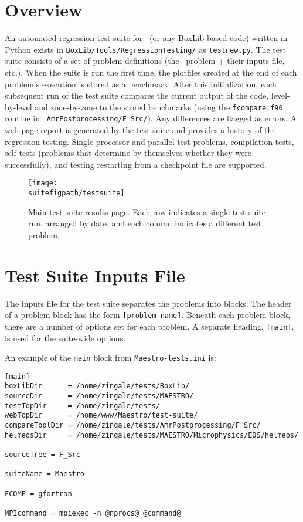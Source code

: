 \section{Overview}

An automated regression test suite for \maestro\ (or any BoxLib-based
code) written in Python exists in {\tt BoxLib/Tools/RegressionTesting/}
as {\tt testnew.py}.  The test suite consists of a set of problem
definitions (the \maestro\ problem + their inputs file, etc.).  When
the suite is run the first time, the plotfiles created at the end of
each problem's execution is stored as a benchmark.  After this
initialization, each subsequent run of the test suite compares the
current output of the code, level-by-level and zone-by-zone to the
stored benchmarks (using the {\tt fcompare.f90} routine in {\tt
  AmrPostprocessing/F\_Src/}).  Any differences are flagged as errors.
A web page report is generated by the test suite and provides a
history of the regression testing.  Single-processor and parallel test
problems, compilation tests, self-tests (problems that determine by
themselves whether they were successfully), and testing restarting
from a checkpoint file are supported.

\begin{figure}[t]
\centering
\texttt{[image: \\suitefigpath/testsuite]}
\caption{\label{fig:test_suite_main} Main test suite results page.  Each 
row indicates a single test suite run, arranged by date, and each column
indicates a different test problem. }
\end{figure}

\section{Test Suite Inputs File}

The inputs file for the test suite separates the problems into blocks.
The header of a problem block has the form {\tt [problem-name]}.
Beneath each problem block, there are a number of options set for each
problem.  A separate heading, {\tt [main]}, is used for the suite-wide
options.

An example of the {\tt main} block from {\tt Maestro-tests.ini} is:
\begin{lstlisting}
[main]
boxLibDir      = /home/zingale/tests/BoxLib/
sourceDir      = /home/zingale/tests/MAESTRO/
testTopDir     = /home/zingale/tests/
webTopDir      = /home/www/Maestro/test-suite/
compareToolDir = /home/zingale/tests/AmrPostprocessing/F_Src/
helmeosDir     = /home/zingale/tests/MAESTRO/Microphysics/EOS/helmeos/

sourceTree = F_Src

suiteName = Maestro

FCOMP = gfortran

MPIcommand = mpiexec -n @nprocs@ @command@
\end{lstlisting}

